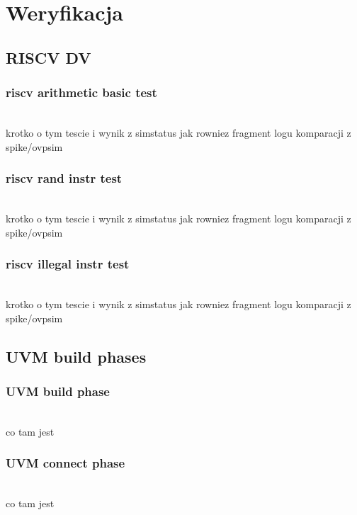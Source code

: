 \documentclass[11pt,a4paper]{article}
\begin{document}
\newpage
\section{Weryfikacja}

	\subsection{RISCV DV}
		\subsubsection{riscv arithmetic basic test}
		\hspace{5mm}
			\\krotko o tym tescie i wynik z simstatus jak rowniez fragment logu komparacji z spike/ovpsim
			
		\subsubsection{riscv rand instr test}
		\hspace{5mm}
			\\krotko o tym tescie i wynik z simstatus jak rowniez fragment logu komparacji z spike/ovpsim
			
		\subsubsection{riscv illegal instr test}
		\hspace{5mm}
			\\krotko o tym tescie i wynik z simstatus jak rowniez fragment logu komparacji z spike/ovpsim

	\subsection{UVM build phases}
	
		\subsubsection{UVM build phase}
		\hspace{5mm}
			\\co tam jest
			
		\subsubsection{UVM connect phase}
		\hspace{5mm}
			\\co tam jest
	
\end{document}
